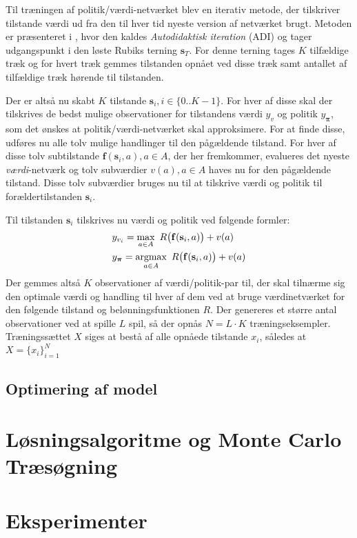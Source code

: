 \documentclass[../main.tex]{subfiles}
\begin{document}
Til træningen af politik/værdi-netværket blev en iterativ metode, der tilskriver tilstande værdi ud fra den til hver tid nyeste version af netværket brugt. 
Metoden er præsenteret i \cite[4.1]{HumansBeGone}, hvor den kaldes \textit{Autodidaktisk iteration} (ADI) og tager udgangspunkt i den løste Rubiks terning \(\mathbf s_T\).
For denne terning tages \(K\) tilfældige træk og for hvert træk gemmes tilstanden opnået ved disse træk samt antallet af tilfældige træk hørende til tilstanden. 

Der er altså nu skabt \(K\) tilstande \(\mathbf{s}_{i}, i\in\{0..K-1\}\). For hver af disse skal der tilskrives de bedst mulige observationer for tilstandens værdi \(y_v\) og politik \(y_{\bm \pi }\), som det ønskes at politik/værdi-netværket skal approksimere.
For at finde disse, udføres nu alle tolv mulige handlinger til den pågældende tilstand. For hver af disse tolv subtilstande \(\mathbf f(\mathbf s_i, a), a\in A\), der her fremkommer, evalueres det nyeste \textit{værdi}-netværk og tolv subværdier \(v(a), a\in A\) haves nu for den pågældende tilstand.
Disse tolv subværdier bruges nu til at tilskrive værdi og politik til forældertilstanden \(\mathbf s _i\).	 

Til tilstanden \(\mathbf s _i\) tilskrives nu værdi og politik ved følgende formler:
\begin{align}
	&y_{v_i}= \operatorname*{max}_{a\in A}\  R\big(\mathbf f(\mathbf s_i, a)\big)+v(a)\label{eq:targetval}
	\\
	& y_{\bm \pi } = \operatorname*{argmax}_{a\in A} \  R\big(\mathbf f(\mathbf s_i, a)\big)+v(a) \label{eq:targetpi}
\end{align}
Der gemmes altså \(K\) observationer af værdi/politik-par til, der skal tilnærme sig den optimale værdi og handling til hver af dem ved at bruge værdinetværket for den følgende tilstand og belønningsfunktionen \(R\). 
Der genereres et større antal observationer ved at spille \(L\) spil, så der opnås \(N=L\cdot K\) træningseksempler.
Træningssættet $ X $ siges at bestå af alle opnåede tilstande $ x_i $, således at $ X=\{x_i\}_{i=1}^N $


\subsection*{Optimering af model}




\section{Løsningsalgoritme og Monte Carlo Træsøgning}

\section{Eksperimenter}
\end{document}
